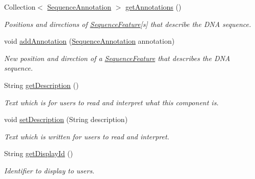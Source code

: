 \begin{DoxyCompactItemize}
\item 
Collection$<$ \hyperlink{classorg_1_1sbolstandard_1_1lib_s_b_o_lj_1_1_sequence_annotation}{SequenceAnnotation} $>$ \hyperlink{classorg_1_1sbolstandard_1_1lib_s_b_o_lj_1_1_dna_component_a3e79a9ba42823f8fb76cb5a7acc30a25}{getAnnotations} ()
\begin{DoxyCompactList}\small\item\em Positions and directions of {\ttfamily \hyperlink{classorg_1_1sbolstandard_1_1lib_s_b_o_lj_1_1_sequence_feature}{SequenceFeature}}\mbox{[}s\mbox{]} that describe the DNA sequence. \item\end{DoxyCompactList}\item 
void \hyperlink{classorg_1_1sbolstandard_1_1lib_s_b_o_lj_1_1_dna_component_a204c63e01c40b72405a339be55a4c609}{addAnnotation} (\hyperlink{classorg_1_1sbolstandard_1_1lib_s_b_o_lj_1_1_sequence_annotation}{SequenceAnnotation} annotation)
\begin{DoxyCompactList}\small\item\em New position and direction of a {\ttfamily \hyperlink{classorg_1_1sbolstandard_1_1lib_s_b_o_lj_1_1_sequence_feature}{SequenceFeature}} that describes the DNA sequence. \item\end{DoxyCompactList}\item 
String \hyperlink{classorg_1_1sbolstandard_1_1lib_s_b_o_lj_1_1_dna_component_aa6dd4476913f41b504a5d287384d1f38}{getDescription} ()
\begin{DoxyCompactList}\small\item\em Text which is for users to read and interpret what this component is. \item\end{DoxyCompactList}\item 
void \hyperlink{classorg_1_1sbolstandard_1_1lib_s_b_o_lj_1_1_dna_component_a3e1a97df49a463c10e86e3fd9f9ec736}{setDescription} (String description)
\begin{DoxyCompactList}\small\item\em Text which is written for users to read and interpret. \item\end{DoxyCompactList}\item 
String \hyperlink{classorg_1_1sbolstandard_1_1lib_s_b_o_lj_1_1_dna_component_ab0ce1dc35a70c136ca8f5254c3e79f7f}{getDisplayId} ()
\begin{DoxyCompactList}\small\item\em Identifier to display to users. \item\end{DoxyCompactList}\item 

\end{DoxyCompactItemize}
